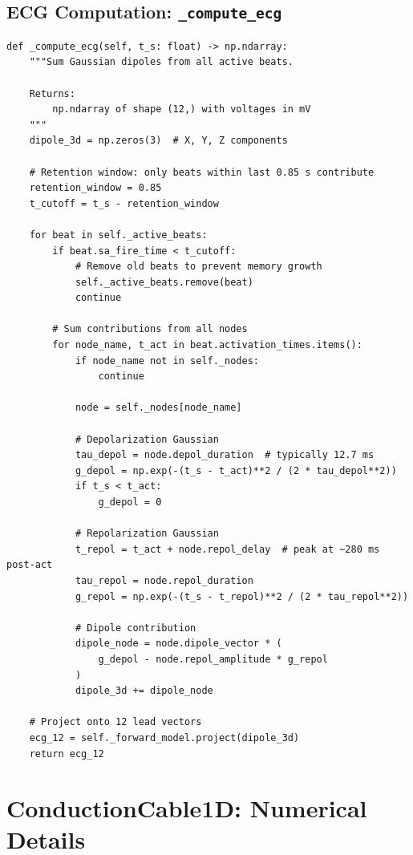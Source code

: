 \documentclass[12pt,a4paper,oneside]{book}
\begin{document}
\subsection{ECG Computation: \texttt{\_compute\_ecg}}

\begin{Verbatim}[formatcom=\color{black}]
def _compute_ecg(self, t_s: float) -> np.ndarray:
    """Sum Gaussian dipoles from all active beats.
    
    Returns:
        np.ndarray of shape (12,) with voltages in mV
    """
    dipole_3d = np.zeros(3)  # X, Y, Z components
    
    # Retention window: only beats within last 0.85 s contribute
    retention_window = 0.85
    t_cutoff = t_s - retention_window
    
    for beat in self._active_beats:
        if beat.sa_fire_time < t_cutoff:
            # Remove old beats to prevent memory growth
            self._active_beats.remove(beat)
            continue
        
        # Sum contributions from all nodes
        for node_name, t_act in beat.activation_times.items():
            if node_name not in self._nodes:
                continue
            
            node = self._nodes[node_name]
            
            # Depolarization Gaussian
            tau_depol = node.depol_duration  # typically 12.7 ms
            g_depol = np.exp(-(t_s - t_act)**2 / (2 * tau_depol**2))
            if t_s < t_act:
                g_depol = 0
            
            # Repolarization Gaussian
            t_repol = t_act + node.repol_delay  # peak at ~280 ms post-act
            tau_repol = node.repol_duration
            g_repol = np.exp(-(t_s - t_repol)**2 / (2 * tau_repol**2))
            
            # Dipole contribution
            dipole_node = node.dipole_vector * (
                g_depol - node.repol_amplitude * g_repol
            )
            dipole_3d += dipole_node
    
    # Project onto 12 lead vectors
    ecg_12 = self._forward_model.project(dipole_3d)
    return ecg_12
\end{Verbatim}

\section{ConductionCable1D: Numerical Details}
\end{document}
